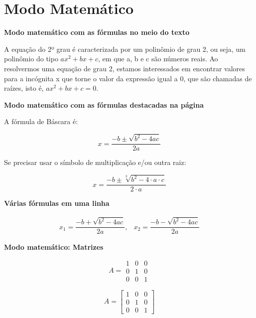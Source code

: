 \documentclass[12pt]{article}
\begin{document}
\newpage
\section{Modo Matemático}

\textbf{Modo matemático com as fórmulas no meio do texto}

A equação do 2º grau é caracterizada por um polinômio de grau 2, ou seja, um polinômio do tipo $ax^2+bx+c$, em que a, b e c são números reais. Ao resolvermos uma equação de grau 2, estamos interessados em encontrar valores para a incógnita x que torne o valor da expressão igual a 0, que são chamadas de raízes, isto é, $ax^2 + bx +c = 0$.

\textbf{Modo matemático com as fórmulas destacadas na página}

A fórmula de Báscara é:

\begin{equation}
	x = \frac{-b \pm \sqrt{b^2 -4ac}}{2a}
\end{equation}

Se precisar usar o símbolo de multiplicação e/ou outra raiz:

\begin{equation}
	x = \frac{-b \pm \sqrt[3]{b^2 -4\cdot a\cdot c}}{2\cdot a}
\end{equation}

\textbf{Várias fórmulas em uma linha}

\begin{equation}
	\begin{array}{cc}
		x_1 = \dfrac{-b + \sqrt{b^2 -4ac}}{2a}, & 
		x_2 = \dfrac{-b - \sqrt{b^2 -4ac}}{2a}
	\end{array}
\end{equation}


\textbf{Modo matemático: Matrizes}

\begin{equation}
A = \begin{matrix}
	1 & 0  & 0  \\
	0 & 1  & 0  \\
	0 & 0  & 1 
   \end{matrix}
\end{equation}

\begin{equation}
	A = \begin{bmatrix}
		1 & 0  & 0  \\
		0 & 1  & 0  \\
		0 & 0  & 1 
	\end{bmatrix}
\end{equation}
\end{document}
